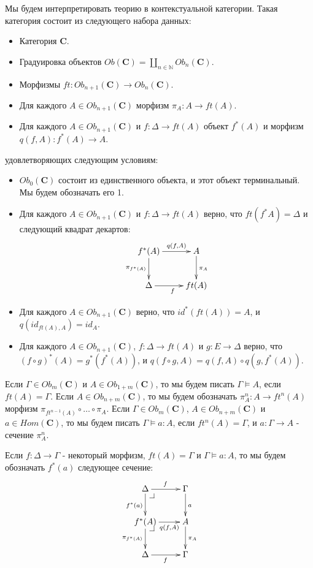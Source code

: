 \documentclass{amsart}
\makeatletter
\theoremstyle{definition}
\theoremstyle{remark}
\newcommand{\cat}[1]{\mathbf{#1}}
\renewcommand{\C}{\cat{C}}
\newcommand{\pb}[1][dr]{\save*!/#1-1.2pc/#1:(-1,1)@^{|-}\restore}
\numberwithin{figure}{section}
\makeatother
\begin{document}
Мы будем интерпретировать теорию в контекстуальной категории.
Такая категория состоит из следующего набора данных:
\begin{itemize}
\item Категория $\C$.
\item Градуировка объектов $Ob(\C) = \coprod_{n \in \mathbb{N}} Ob_n(\C)$.
\item Морфизмы $ft : Ob_{n+1}(\C) \to Ob_n(\C)$.
\item Для каждого $A \in Ob_{n+1}(\C)$ морфизм $\pi_A : A \to ft(A)$.
\item Для каждого $A \in Ob_{n+1}(\C)$ и $f : \Delta \to ft(A)$ объект $f^*(A)$ и морфизм $q(f, A) : f^*(A) \to A$.
\end{itemize}
удовлетворяющих следующим условиям:
\begin{itemize}
\item $Ob_0(\C)$ состоит из единственного объекта, и этот объект терминальный. Мы будем обозначать его 1.
\item Для каждого $A \in Ob_{n+1}(\C)$ и $f : \Delta \to ft(A)$ верно, что $ft(f^* A) = \Delta$ и следующий квадрат декартов:
\[ \xymatrix{ f^*(A) \ar[d]_{\pi_{f^*(A)}} \ar[r]^-{q(f, A)} & A \ar[d]^{\pi_A} \\
              \Delta \ar[r]_f & ft(A)
            } \]
\item Для каждого $A \in Ob_{n+1}(\C)$ верно, что $id^*(ft(A)) = A$, и $q(id_{ft(A), A}) = id_A$.
\item Для каждого $A \in Ob_{n+1}(\C)$, $f : \Delta \to ft(A)$ и $g : E \to \Delta$ верно, что $(f \circ g)^*(A) = g^*(f^*(A))$, и $q(f \circ g, A) = q(f, A) \circ q(g, f^*(A))$.
\end{itemize}

Если $\Gamma \in Ob_m(\C)$ и $A \in Ob_{1+m}(\C)$, то мы будем писать $\Gamma \models A$, если $ft(A) = \Gamma$.
Если $A \in Ob_{n+m}(\C)$, то мы будем обозначать $\pi^n_A : A \to ft^n(A)$ морфизм $\pi_{ft^{n-1}(A)} \circ \ldots \circ \pi_A$.
Если $\Gamma \in Ob_m(\C)$, $A \in Ob_{n+m}(\C)$ и $a \in Hom(\C)$, то мы будем писать $\Gamma \models a : A$, если $ft^n(A) = \Gamma$, и $a : \Gamma \to A$ - сечение $\pi^n_A$.

Если $f : \Delta \to \Gamma$ - некоторый морфизм, $ft(A) = \Gamma$ и $\Gamma \models a : A$, то мы будем обозначать $f^*(a)$ следующее сечение:
\[ \xymatrix{ \Delta \ar[r]^f \ar[d]_{f^*(a)} \pb                & \Gamma \ar[d]^a \\
              f^*(A) \ar[r]_-{q(f, A)} \ar[d]_{\pi_{f^*(A)}} \pb & A \ar[d]^{\pi_A} \\
              \Delta \ar[r]_f                                    & \Gamma
                 }\]
\end{document}
